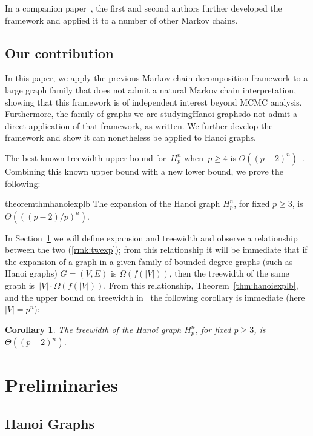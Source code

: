 \documentclass[
final
]{dmtcs-episciences}
\newtheorem{corollary}[theorem]{Corollary}
\begin{document}
In a companion paper~\citep{eppfrisharx}, the first and second authors further developed the framework and applied it to a number of other Markov chains. 

\subsection{Our contribution}
In this paper, we apply the previous Markov chain decomposition framework to a large graph family that does not admit a natural Markov chain interpretation, showing that this framework is of independent interest beyond MCMC analysis. Furthermore, the family of graphs we are studying\textemdash Hanoi graphs\textemdash do not admit a direct application of that framework, as written. We further develop the framework and show it can nonetheless be applied to Hanoi graphs. 

The best known treewidth upper bound for~$H_p^n$ when~$p \geq 4$ is $O((p-2)^n)$~\citep{hanoitw}. Combining this known upper bound with a new lower bound, we prove the following:
\begin{restatable}{theorem}{thmhanoiexplb}
\label{thm:hanoiexplb}
The expansion of the Hanoi graph $H_p^n$, for fixed $p \geq 3$, is $\Theta(((p-2)/p)^n)$.
\end{restatable}


In Section~\ref{sec:prelim} we will define expansion and treewidth and observe a relationship between the two (\cref{rmk:twexp}); from this relationship it will be immediate that if the expansion of a graph in a given family of bounded-degree graphs (such as Hanoi graphs) $G = (V, E)$ is $\Omega(f(|V|))$, then the treewidth of the same graph is~$|V|\cdot \Omega(f(|V|))$. From this relationship, Theorem~\ref{thm:hanoiexplb}, and the upper bound on treewidth in~\citep{hanoitw} the following corollary is immediate (here $|V| = p^n$):
\begin{corollary}
\label{cor:hanoitwtight}
The treewidth of the Hanoi graph $H_p^n$, for fixed $p \geq 3$, is $\Theta((p-2)^n)$.
\end{corollary}



\section{Preliminaries}
\label{sec:prelim}
\subsection{Hanoi Graphs}
\end{document}
